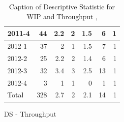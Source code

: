 \documentclass[UKenglish]{ifimaster}  %
\begin{document}
\begin{appendices}
\begin{table}[!htbp]
\begin{adjustwidth}{-2.5cm}{}
\begin{subfigure}[b]{0.3\textwidth}
{\begin{tabular}{ | l | r | r | r | r | r | r | }
 2011-4  & 44 & 2.2 & 2 & 1.5 & 6 & 1 \\ \hline
 2012-1  & 37 & 2 & 1 & 1.5 & 7 & 1 \\ \hline
 2012-2  & 25 & 2.2 & 2 & 1.4 & 6 & 1 \\ \hline
 2012-3  & 32 & 3.4 & 3 & 2.5 & 13 & 1 \\ \hline
 2012-4  & 3 & 1 & 1 & 0 &1 & 1 \\ \hline
 Total  & 328 & 2.7 & 2 & 2.1 & 14 & 1 \\ \hline
\end{tabular}
}
\caption{DS - Throughput}
 \label{DS:Throughput:7}
\end{subfigure}
\end{adjustwidth}
\caption[Optional caption for list of figures]{Caption of Descriptive Statistic for WIP and Throughput  , }
\label{DS:7:1}
\end{table}


\end{appendices}
\end{document}
